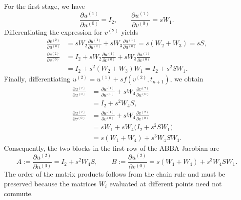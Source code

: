 \documentclass[11pt,a4paper]{article}
\newcommand{\Id}{I}
\begin{document}
For the first stage, we have
\[
 \frac{\partial u^{(1)}}{\partial u^{(0)}}=\Id_2,
 \qquad
 \frac{\partial u^{(1)}}{\partial v^{(0)}}=sW_1.
\]
Differentiating the expression for $v^{(2)}$ yields
\begin{align*}
 \frac{\partial v^{(2)}}{\partial u^{(0)}}
 &=sW_2\frac{\partial u^{(1)}}{\partial u^{(0)}}
   +sW_3\frac{\partial u^{(1)}}{\partial u^{(0)}}
 =s(W_2+W_3)=sS,\\
 \frac{\partial v^{(2)}}{\partial v^{(0)}}
 &=\Id_2
   +sW_2\frac{\partial u^{(1)}}{\partial v^{(0)}}
   +sW_3\frac{\partial u^{(1)}}{\partial v^{(0)}}\\
 &=\Id_2+s^2(W_2+W_3)W_1
 =\Id_2+s^2SW_1.
\end{align*}
Finally, differentiating
$u^{(2)}=u^{(1)}+s f(v^{(2)},t_{n+1})$, we obtain
\begin{align*}
 \frac{\partial u^{(2)}}{\partial u^{(0)}}
 &=\frac{\partial u^{(1)}}{\partial u^{(0)}}
   +sW_4\frac{\partial v^{(2)}}{\partial u^{(0)}}\\
 &=\Id_2+s^2W_4S,\\[1mm]
 \frac{\partial u^{(2)}}{\partial v^{(0)}}
 &=\frac{\partial u^{(1)}}{\partial v^{(0)}}
   +sW_4\frac{\partial v^{(2)}}{\partial v^{(0)}}\\
 &=sW_1+sW_4\bigl(\Id_2+s^2SW_1\bigr)\\
 &=s(W_1+W_4)+s^3W_4SW_1.
\end{align*}
Consequently, the two blocks in the first row of the ABBA Jacobian are
\[
 \boxed{
 A:=\frac{\partial u^{(2)}}{\partial u^{(0)}}
 =\Id_2+s^2W_4S,
 \qquad
 B:=\frac{\partial u^{(2)}}{\partial v^{(0)}}
 =s(W_1+W_4)+s^3W_4SW_1.
 }
\]
The order of the matrix products follows from the chain rule and must be preserved because
the matrices $W_i$ evaluated at different points need not commute.
\end{document}
